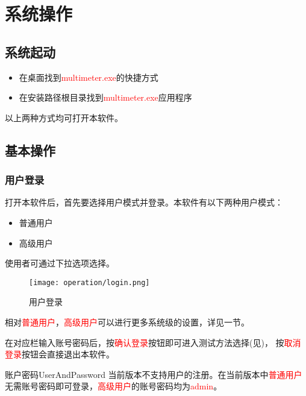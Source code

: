 \chapter{系统操作\label{ch:operation}}
\section{系统起动}
\begin{itemize}
    \item 在桌面找到\textcolor{red}{multimeter.exe}的快捷方式
    \item 在安装路径根目录找到\textcolor{red}{multimeter.exe}应用程序
\end{itemize}
以上两种方式均可打开本软件。
\section{基本操作}
\subsection{用户登录}
打开本软件后，首先要选择用户模式并登录。本软件有以下两种用户模式：
\begin{itemize}
    \item 普通用户
    \item 高级用户
\end{itemize}
使用者可通过下拉选项选择。
\begin{figure}[H]
    \centering
    \texttt{[image: operation/login.png]}
    \caption{ 用户登录 \label{fig:login}}
\end{figure}
相对\textcolor{red}{普通用户}，\textcolor{red}{高级用户}可以进行更多系统级的设置，详见一节。

在对应栏输入账号密码后，按\textcolor{red}{确认登录}按钮即可进入测试方法选择(见)，
按\textcolor{red}{取消登录}按钮会直接退出本软件。
\begin{tips}{账户密码}{UserAndPassword}
    当前版本不支持用户的注册。在当前版本中\textcolor{red}{普通用户}无需账号密码即可登录，\textcolor{red}{高级用户}的账号密码均为\textcolor{red}{admin}。
\end{tips}
